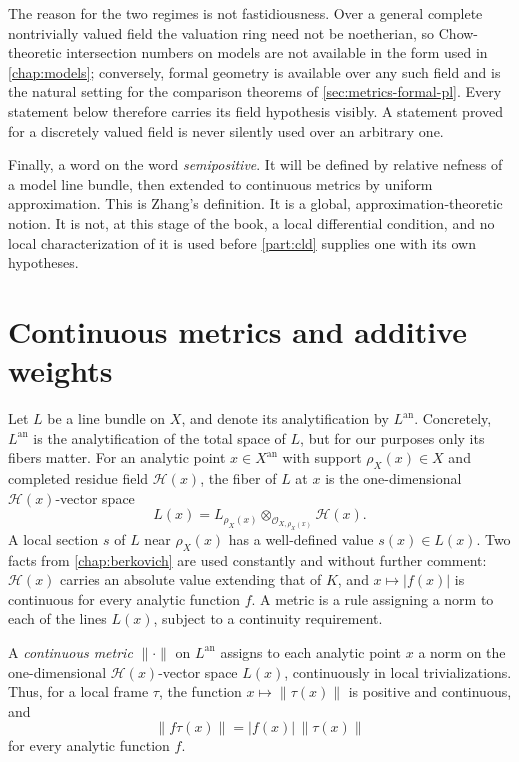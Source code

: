The reason for the two regimes is not fastidiousness. Over a general
complete nontrivially valued field the valuation ring need not be
noetherian, so Chow-theoretic intersection numbers on models are not
available in the form used in \cref{chap:models}; conversely, formal
geometry is available over any such field and is the natural setting for the
comparison theorems of \cref{sec:metrics-formal-pl}. Every statement below
therefore carries its field hypothesis visibly. A statement proved for a
discretely valued field is never silently used over an arbitrary one.

Finally, a word on the word \emph{semipositive}. It will be defined by
relative nefness of a model line bundle, then extended to continuous metrics
by uniform approximation. This is Zhang's definition. It is a global,
approximation-theoretic notion. It is not, at this stage of the book, a
local differential condition, and no local characterization of it is used
before \cref{part:cld} supplies one with its own hypotheses.

\section{Continuous metrics and additive weights}
\label{sec:metrics-continuous}

Let $L$ be a line bundle on $X$, and denote its analytification by
$L^{\mathrm{an}}$. Concretely, $L^{\mathrm{an}}$ is the analytification
of the total space of $L$, but for our purposes only its fibers matter.
For an analytic point $x\in X^{\mathrm{an}}$ with support
$\rho_X(x)\in X$ and completed residue field $\mathcal H(x)$, the fiber
of $L$ at $x$ is the one-dimensional $\mathcal H(x)$-vector space
\[
 L(x)=L_{\rho_X(x)}\otimes_{\mathcal O_{X,\rho_X(x)}}\mathcal H(x).
\]
A local section $s$ of $L$ near $\rho_X(x)$ has a well-defined value
$s(x)\in L(x)$. Two facts from \cref{chap:berkovich} are used constantly
and without further comment: $\mathcal H(x)$ carries an absolute value
extending that of $K$, and $x\mapsto|f(x)|$ is continuous for every
analytic function $f$. A metric is a rule assigning a norm to each of the
lines $L(x)$, subject to a continuity requirement.

\begin{definition}
\label{def:metrics-continuous}
A \emph{continuous metric} $\|\cdot\|$ on $L^{\mathrm{an}}$ assigns to
each analytic point $x$ a norm on the one-dimensional
$\mathcal H(x)$-vector space $L(x)$, continuously in local
trivializations. Thus, for a local frame $\tau$, the function
$x\mapsto\|\tau(x)\|$ is positive and continuous, and
\[
                    \|f\tau(x)\|=|f(x)|\,\|\tau(x)\|
\]
for every analytic function $f$.
\end{definition}

